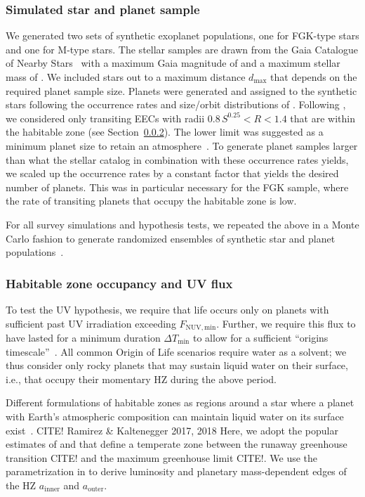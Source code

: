 \documentclass[twocolumn,twocolappendix,linenumbers]{aastex631}
\begin{document}
\subsubsection{Simulated star and planet sample}
We generated two sets of synthetic exoplanet populations, one for FGK-type stars and one for M-type stars.
The stellar samples are drawn from the Gaia Catalogue of Nearby Stars~\citep{Smart2021} with a maximum Gaia magnitude of  and a maximum stellar mass of  \SI{}{\Msun}.
We included stars out to a maximum distance $d_{\max}$ that depends on the required planet sample size.
Planets were generated and assigned to the synthetic stars following the occurrence rates and size/orbit distributions of \citet{Bergsten2022}.
Following \citet{Bixel2021}, we considered only transiting \glspl{EEC} with radii $0.8\, S^{0.25} < R < 1.4 $ that are within the habitable zone (see Section~\ref{sec:met-hz}).
The lower limit was suggested as a minimum planet size to retain an atmosphere~\citep{Zahnle2017}.
To generate planet samples larger than what the stellar catalog in combination with these occurrence rates yields, we scaled up the occurrence rates by a constant factor that yields the desired number of planets.
This was in particular necessary for the FGK sample, where the rate of transiting planets that occupy the habitable zone is low.

For all survey simulations and hypothesis tests, we repeated the above in a Monte Carlo fashion to generate randomized ensembles of synthetic star and planet populations~\citep[compare][]{Bixel2021}.



\subsubsection{Habitable zone occupancy and UV flux}\label{sec:met-hz}
To test the UV hypothesis, we require that life occurs only on planets with sufficient past UV irradiation exceeding $F_\mathrm{NUV, min}$.
Further, we require this flux to have lasted for a minimum duration $\Delta T_\mathrm{min}$ to allow for a sufficient ``origins timescale''~\citep{Rimmer2023}.
All common Origin of Life scenarios require water as a solvent;
we thus consider only rocky planets that may sustain liquid water on their surface, i.e., that occupy their momentary \gls{HZ} during the above period.

Different formulations of habitable zones as regions around a star where a planet with Earth's atmospheric composition can maintain liquid water on its surface exist~\citep[e.g.,][]{MolLous2022,Spinelli2023,Tuchow2023}. CITE! Ramirez \& Kaltenegger 2017, 2018
Here, we adopt the popular estimates of \citet{Kasting1993} and \citet{Kopparapu2013,Kopparapu2014} that define a temperate zone between the runaway greenhouse transition CITE! and the maximum greenhouse limit CITE!.
We use the parametrization in \citet{Kopparapu2014} to derive luminosity and planetary mass-dependent edges of the \gls{HZ} $a_\mathrm{inner}$ and $a_\mathrm{outer}$.
\end{document}
